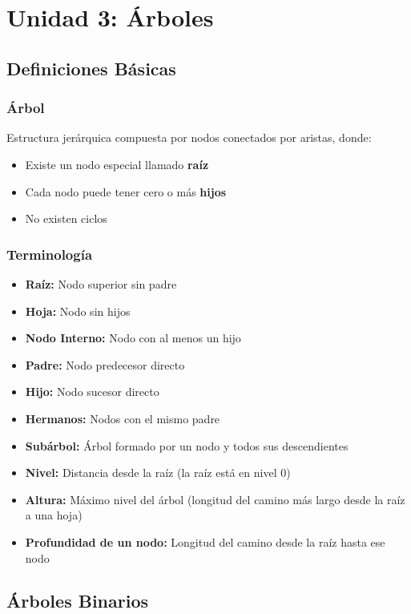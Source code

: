 \documentclass[12pt,a4paper]{article}
\begin{document}
\newpage

\section{Unidad 3: Árboles}

\subsection{Definiciones Básicas}

\subsubsection{Árbol}
Estructura jerárquica compuesta por nodos conectados por aristas, donde:
\begin{itemize}
    \item Existe un nodo especial llamado \textbf{raíz}
    \item Cada nodo puede tener cero o más \textbf{hijos}
    \item No existen ciclos
\end{itemize}

\subsubsection{Terminología}
\begin{itemize}
    \item \textbf{Raíz:} Nodo superior sin padre
    \item \textbf{Hoja:} Nodo sin hijos
    \item \textbf{Nodo Interno:} Nodo con al menos un hijo
    \item \textbf{Padre:} Nodo predecesor directo
    \item \textbf{Hijo:} Nodo sucesor directo
    \item \textbf{Hermanos:} Nodos con el mismo padre
    \item \textbf{Subárbol:} Árbol formado por un nodo y todos sus descendientes
    \item \textbf{Nivel:} Distancia desde la raíz (la raíz está en nivel 0)
    \item \textbf{Altura:} Máximo nivel del árbol (longitud del camino más largo desde la raíz a una hoja)
    \item \textbf{Profundidad de un nodo:} Longitud del camino desde la raíz hasta ese nodo
\end{itemize}

\subsection{Árboles Binarios}
\end{document}

